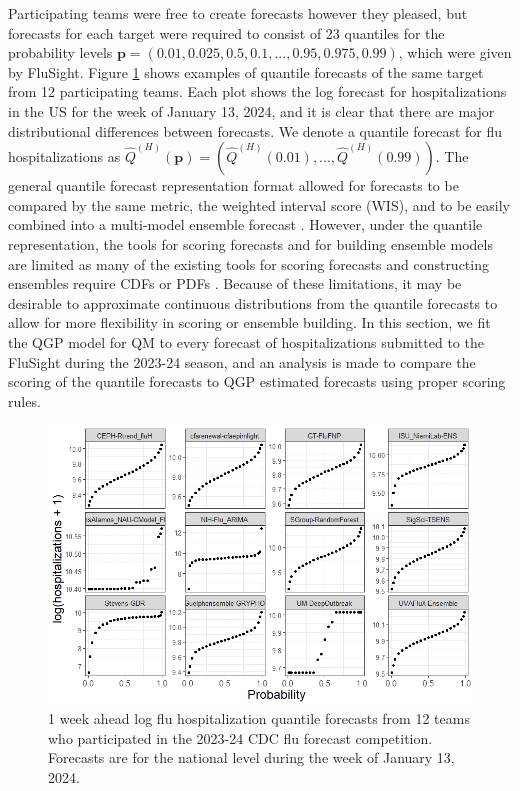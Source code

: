 \documentclass[preprint,12pt,authoryear]{elsarticle}
\begin{document}
Participating teams were free to create forecasts however they pleased, but forecasts for each target were required to consist of 23 quantiles for the probability levels $\boldsymbol{p} =(0.01, 0.025, 0.5, 0.1, ..., 0.95, 0.975, 0.99)$, which were given by FluSight. Figure \ref{fig:quant_forcs_us} shows examples of quantile forecasts of the same target from 12 participating teams. Each plot shows the log forecast for hospitalizations in the US for the week of January 13, 2024, and it is clear that there are major distributional differences between forecasts.
We denote a quantile forecast for flu hospitalizations as $\hat{Q}^{(H)}(\boldsymbol{p}) = (\hat{Q}^{(H)}(0.01), ..., \hat{Q}^{(H)}(0.99))$. 
The general quantile forecast representation format allowed for forecasts to be compared by the same metric, the weighted interval score (WIS), and to be easily combined into a multi-model ensemble forecast \cite[]{mathis2024evaluation}. However, under the quantile representation, the tools for scoring forecasts and for building ensemble models are limited as many of the existing tools for scoring forecasts and constructing ensembles require CDFs or PDFs \cite[]{wadsworth2023mixture,ranjan2010combining}. Because of these limitations, it may be desirable to approximate continuous distributions from the quantile forecasts to allow for more flexibility in scoring or ensemble building. In this section, we fit the QGP model for QM to every forecast of hospitalizations submitted to the FluSight during the 2023-24 season, and an analysis is made to compare the scoring of the quantile forecasts to QGP estimated forecasts using proper scoring rules.

\begin{figure}[hbt!]
    \centering
    \includegraphics[scale=.6]{Images/quant_forcs_us_01_13_24.png}
    \caption{1 week ahead log flu hospitalization quantile forecasts from 12  teams who participated in the 2023-24 CDC flu forecast competition. Forecasts are for the national level during the week of January 13, 2024.}
    \label{fig:quant_forcs_us}
\end{figure}
\end{document}
